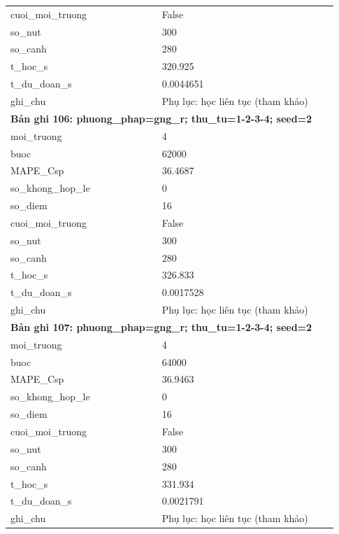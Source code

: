 \begin{longtable}{p{0.43\linewidth}p{0.50\linewidth}}
cuoi\_\allowbreak moi\_\allowbreak truong & False \\
so\_\allowbreak nut & 300 \\
so\_\allowbreak canh & 280 \\
t\_\allowbreak hoc\_\allowbreak s & 320.925 \\
t\_\allowbreak du\_\allowbreak doan\_\allowbreak s & 0.0044651 \\
ghi\_\allowbreak chu & Phụ lục: học liên tục (tham khảo) \\
\midrule
\multicolumn{2}{p{0.95\linewidth}}{\textbf{Bản ghi 106: phuong\_phap=gng\_r; thu\_tu=1-2-3-4; seed=2}} \\
moi\_\allowbreak truong & 4 \\
buoc & 62000 \\
MAPE\_\allowbreak Csp & 36.4687 \\
so\_\allowbreak khong\_\allowbreak hop\_\allowbreak le & 0 \\
so\_\allowbreak diem & 16 \\
cuoi\_\allowbreak moi\_\allowbreak truong & False \\
so\_\allowbreak nut & 300 \\
so\_\allowbreak canh & 280 \\
t\_\allowbreak hoc\_\allowbreak s & 326.833 \\
t\_\allowbreak du\_\allowbreak doan\_\allowbreak s & 0.0017528 \\
ghi\_\allowbreak chu & Phụ lục: học liên tục (tham khảo) \\
\midrule
\multicolumn{2}{p{0.95\linewidth}}{\textbf{Bản ghi 107: phuong\_phap=gng\_r; thu\_tu=1-2-3-4; seed=2}} \\
moi\_\allowbreak truong & 4 \\
buoc & 64000 \\
MAPE\_\allowbreak Csp & 36.9463 \\
so\_\allowbreak khong\_\allowbreak hop\_\allowbreak le & 0 \\
so\_\allowbreak diem & 16 \\
cuoi\_\allowbreak moi\_\allowbreak truong & False \\
so\_\allowbreak nut & 300 \\
so\_\allowbreak canh & 280 \\
t\_\allowbreak hoc\_\allowbreak s & 331.934 \\
t\_\allowbreak du\_\allowbreak doan\_\allowbreak s & 0.0021791 \\
ghi\_\allowbreak chu & Phụ lục: học liên tục (tham khảo) \\

\end{longtable}
